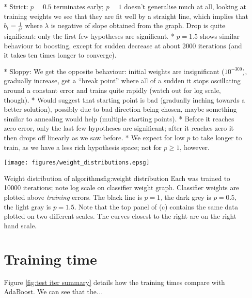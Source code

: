 * Strict: $p=0.5$ terminates early; $p=1$ doesn't generalise much at
  all, looking at training weights we see that they are fit well by a
  straight line, which implies that $b_t = \frac{1}{t^\lambda}$ where
  $\lambda$ is negative of slope obtained from the graph.  Drop is
  quite significant: only the first few hypotheses are significant.
* $p=1.5$ shows similar behaviour to boosting, except for sudden
  decrease at about 2000 iterations (and it takes ten times longer to
  converge).

* Sloppy: We get the opposite behaviour: initial weights are
  insignificant ($10^{-300}$), gradually increase, get a ``break
  point'' where all of a sudden it stops oscillating around a constant
  error and trains quite rapidly (watch out for log scale, though).
* Would suggest that starting point is bad (gradually inching towards
  a better solution), possibly due to bad direction being chosen,
  maybe something similar to annealing would help (multiple starting
  points).
* Before it reaches zero error, only the last few hypotheses are
  significant; after it reaches zero it then drops off linearly as we
  saw before.
* We expect for low $p$ to take longer to train, as we have a less
  rich hypothesis space; not for $p \geq 1$, however.

\begin{linefigure}
\begin{center}
\texttt{[image: figures/weight\_distributions.epsg]}
\end{center}
\begin{capt}{Weight distribution of algorithms}{fig:weight distribution}
Each was trained to 10000 iterations; note log scale on classifier
weight graph.  Classifier weights are plotted above \emph{training}
errors.  The black line is $p=1$, the dark grey is $p=0.5$, the light
gray is $p=1.5$.  Note that the top panel of (c) contains the same
data plotted on two different scales.  The curves closest to the right
are on the right hand scale.
\end{capt}
\end{linefigure}


\section{Training time}

Figure \ref{fig:test iter summary} details how the training times
compare with AdaBoost.  We can see that the...

